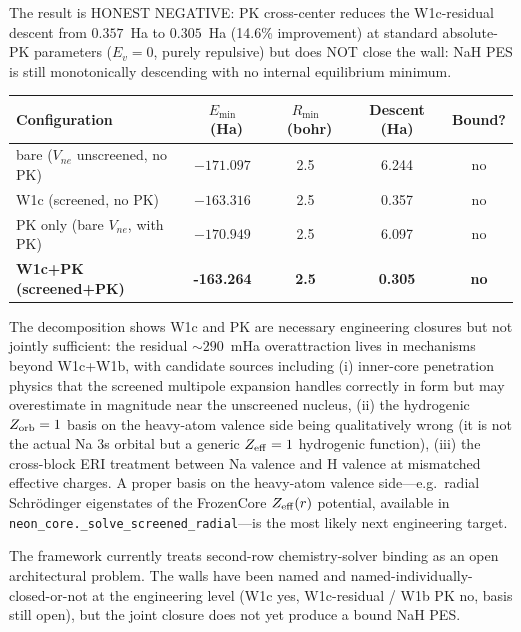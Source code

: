 \documentclass[aps,pra,twocolumn,superscriptaddress,longbibliography]{revtex4-2}
\begin{document}
The result is HONEST NEGATIVE: PK cross-center reduces the
W1c-residual descent from $0.357$~Ha to $0.305$~Ha
(14.6\% improvement) at standard absolute-PK parameters
($E_v = 0$, purely repulsive) but does NOT close the wall:
NaH PES is still monotonically descending with no internal
equilibrium minimum.

\begin{center}
\begin{tabular}{lcccc}
\hline
Configuration & $E_{\min}$~(Ha) & $R_{\min}$~(bohr) & Descent (Ha) & Bound? \\
\hline
bare ($V_{ne}$ unscreened, no PK)        & $-171.097$ & 2.5 & 6.244 & no \\
W1c (screened, no PK)                    & $-163.316$ & 2.5 & 0.357 & no \\
PK only (bare $V_{ne}$, with PK)         & $-170.949$ & 2.5 & 6.097 & no \\
\textbf{W1c+PK (screened+PK)}            & \textbf{-163.264} & \textbf{2.5} & \textbf{0.305} & \textbf{no} \\
\hline
\end{tabular}
\end{center}

The decomposition shows W1c and PK are necessary engineering
closures but not jointly sufficient: the residual ${\sim}290$~mHa
overattraction lives in mechanisms beyond W1c+W1b, with candidate
sources including (i) inner-core penetration physics that the
screened multipole expansion handles correctly in form but may
overestimate in magnitude near the unscreened nucleus,
(ii) the hydrogenic $Z_{\rm orb} = 1$ basis on the heavy-atom
valence side being qualitatively wrong (it is not the actual
Na 3s orbital but a generic $Z_{\rm eff} = 1$ hydrogenic function),
(iii) the cross-block ERI treatment between Na valence and H
valence at mismatched effective charges. A proper basis on the
heavy-atom valence side---e.g.\ radial Schr\"odinger eigenstates
of the FrozenCore $Z_{\rm eff}(r)$ potential, available in
\texttt{neon\_core.\_solve\_screened\_radial}---is the most
likely next engineering target.

The framework currently treats second-row chemistry-solver
binding as an open architectural problem. The walls have been
named and named-individually-closed-or-not at the engineering
level (W1c yes, W1c-residual / W1b PK no, basis still open),
but the joint closure does not yet produce a bound NaH PES.
\end{document}
